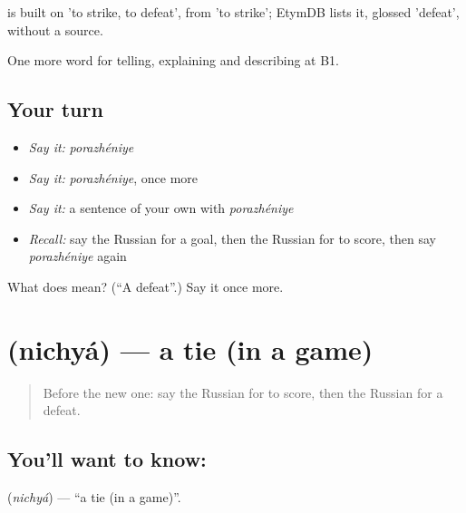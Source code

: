 \begin{cousinweb}
\emph{} is built on \emph{} 'to strike, to defeat', from \emph{} 'to strike'; EtymDB lists it, glossed 'defeat', without a source.
\end{cousinweb}

\begin{grammarlens}[title={What you've built}]
One more word for telling, explaining and describing at B1.
\end{grammarlens}

\subsection*{Your turn}
\begin{itemize}
\raggedright
  \item \emph{Say it:} \emph{porazhéniye}
  \item \emph{Say it:} \emph{porazhéniye}, once more
  \item \emph{Say it:} a sentence of your own with \emph{porazhéniye}
  \item \emph{Recall:} say the Russian for a goal, then the Russian for to score, then say \emph{porazhéniye} again
\end{itemize}

\begin{tcolorbox}[breakable,colback=teal!4,colframe=teal!35!black,title={Before you move on}]
What does  mean? (\textquotedblleft{}A defeat\textquotedblright{}.) Say it once more.
\end{tcolorbox}
\section[\texorpdfstring{\ru{ничья} (nichyá)}{ничья (nichyá)}]{ (nichyá) — a tie (in a game)}

\label{lesson:RU-C510-nichya}



\begin{quote}
Before the new one: say the Russian for to score, then the Russian for a defeat.
\end{quote}

\subsection*{You'll want to know: }
\textbf{} (\emph{nichyá}) — \textquotedblleft{}a tie (in a game)\textquotedblright{}.

